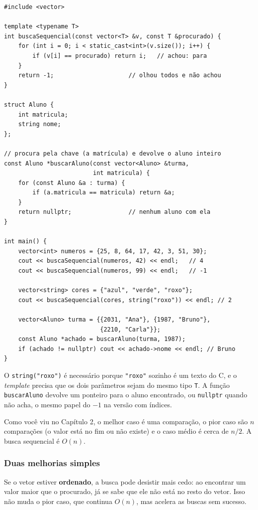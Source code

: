 \begin{codigo}
\begin{Verbatim}[breaklines=true, breaksymbolleft={}, fontsize=\footnotesize]
#include <vector>

template <typename T>
int buscaSequencial(const vector<T> &v, const T &procurado) {
    for (int i = 0; i < static_cast<int>(v.size()); i++) {
        if (v[i] == procurado) return i;   // achou: para
    }
    return -1;                     // olhou todos e não achou
}

struct Aluno {
    int matricula;
    string nome;
};

// procura pela chave (a matrícula) e devolve o aluno inteiro
const Aluno *buscarAluno(const vector<Aluno> &turma,
                         int matricula) {
    for (const Aluno &a : turma) {
        if (a.matricula == matricula) return &a;
    }
    return nullptr;                // nenhum aluno com ela
}

int main() {
    vector<int> numeros = {25, 8, 64, 17, 42, 3, 51, 30};
    cout << buscaSequencial(numeros, 42) << endl;   // 4
    cout << buscaSequencial(numeros, 99) << endl;   // -1

    vector<string> cores = {"azul", "verde", "roxo"};
    cout << buscaSequencial(cores, string("roxo")) << endl; // 2

    vector<Aluno> turma = {{2031, "Ana"}, {1987, "Bruno"},
                           {2210, "Carla"}};
    const Aluno *achado = buscarAluno(turma, 1987);
    if (achado != nullptr) cout << achado->nome << endl; // Bruno
}
\end{Verbatim}
\end{codigo}

O \texttt{string("roxo")} é necessário porque \texttt{"roxo"} sozinho é um texto do C, e o \textit{template} precisa que os dois parâmetros sejam do mesmo tipo \texttt{T}. A função \texttt{buscarAluno} devolve um ponteiro para o aluno encontrado, ou \texttt{nullptr} quando não acha, o mesmo papel do $-1$ na versão com índices.

Como você viu no Capítulo 2, o melhor caso é uma comparação, o pior caso são $n$ comparações (o valor está no fim ou não existe) e o caso médio é cerca de $n/2$. A busca sequencial é $O(n)$.

\subsubsection{Duas melhorias simples}

Se o vetor estiver \textbf{ordenado}, a busca pode desistir mais cedo: ao encontrar um valor maior que o procurado, já se sabe que ele não está no resto do vetor. Isso não muda o pior caso, que continua $O(n)$, mas acelera as buscas sem sucesso.

